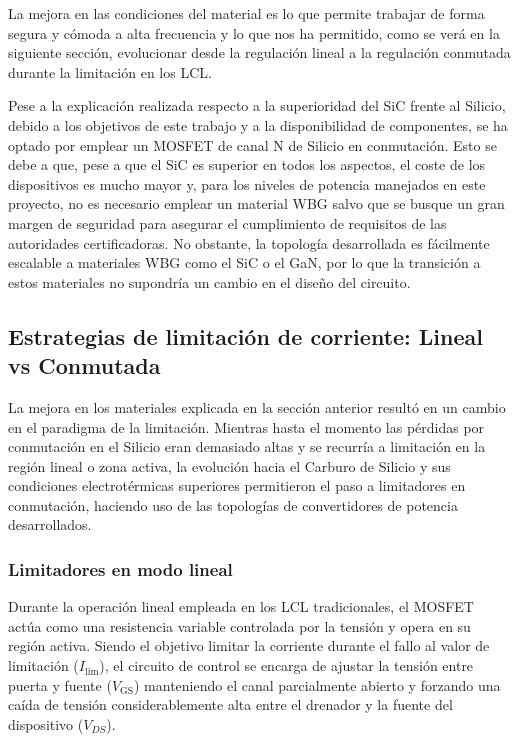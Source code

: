 \documentclass[12pt]{report} %
\begin{document}
La mejora en las condiciones del material es lo que permite trabajar de forma segura y cómoda a alta frecuencia y lo que nos ha permitido, como se verá en la siguiente sección, evolucionar desde la regulación lineal a la regulación conmutada durante la limitación en los LCL. 

Pese a la explicación realizada respecto a la superioridad del SiC frente al Silicio, debido a los objetivos de este trabajo y a la disponibilidad de componentes, se ha optado por emplear un MOSFET de canal N de Silicio en conmutación. Esto se debe a que, pese a que el SiC es superior en todos los aspectos, el coste de los dispositivos es mucho mayor y, para los niveles de potencia manejados en este proyecto, no es necesario emplear un material WBG salvo que se busque un gran margen de seguridad para asegurar el cumplimiento de requisitos de las autoridades certificadoras. No obstante, la topología desarrollada es fácilmente escalable a materiales WBG como el SiC o el GaN, por lo que la transición a estos materiales no supondría un cambio en el diseño del circuito.

\subsection{Estrategias de limitación de corriente: Lineal vs Conmutada}
La mejora en los materiales explicada en la sección anterior resultó en un cambio en el paradigma de la limitación. Mientras hasta el momento las pérdidas por conmutación en el Silicio eran demasiado altas y se recurría a limitación en la región lineal o zona activa, la evolución hacia el Carburo de Silicio y sus condiciones electrotérmicas superiores permitieron el paso a limitadores en conmutación, haciendo uso de las topologías de convertidores de potencia desarrollados. 

\subsubsection{Limitadores en modo lineal}
Durante la operación lineal empleada en los LCL tradicionales, el MOSFET actúa como una resistencia variable  controlada por la tensión y opera en su región activa. Siendo el objetivo limitar la corriente durante el fallo al valor de limitación ($I_\text{lim}$), el circuito de control se encarga de ajustar la tensión entre puerta y fuente ($V_\text{GS}$) manteniendo el canal parcialmente abierto y forzando una caída de tensión considerablemente alta entre el drenador y la fuente del dispositivo ($V_{DS}$). 
\end{document}
